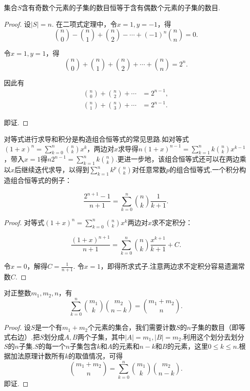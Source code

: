 \begin{corollary}
    集合\(S\)含有奇数个元素的子集的数目恒等于含有偶数个元素的子集的数目.
\end{corollary}
\begin{proof}
    设\(|S|=n\). 在二项式定理中，令\(x=1,y=-1\)，得
    \[\binom{n}{0} - \binom{n}{1} + \binom{n}{2} - \cdots + (-1)^n \binom{n}{n} = 0 .\]

    令\(x=1,y=1\)，得
    \[\binom{n}{0} + \binom{n}{1} + \binom{n}{2} + \cdots + \binom{n}{n} = 2^n.\]

    因此有
    \begin{align*}
\binom{n}{0} + \binom{n}{2} + \cdots &= 2^{n-1}, \\
\binom{n}{1} + \binom{n}{3} + \cdots &= 2^{n-1}.
    \end{align*}

    即证.
\end{proof}

对等式进行求导和积分是构造组合恒等式的常见思路.如对等式\((1 + x)^n = \sum_{k=0}^{n} \binom{n}{k} x^k\)，两边对\(x\)求导得\(n(1 + x)^{n-1} = \sum_{k=1}^{n} k \binom{n}{k} x^{k-1}\)，带入\(x=1\)得\(n 2^{n-1} = \sum_{k=1}^{n} k \binom{n}{k}\).更进一步地，该组合恒等式还可以在两边乘以\(x\)后继续迭代求导，以得到\(\sum_{k=1}^{n} k^p \binom{n}{k}\)对任意常数\(p\)的组合恒等式.一个积分构造组合恒等式的例子：

\begin{corollary}
    $$\frac{2^{n+1}-1}{n+1} = \sum_{k=0}^{n} \binom{n}{k} \frac{1}{k+1}.$$
\end{corollary}
\begin{proof}
    对等式\((1 + x)^n = \sum_{k=0}^{n} \binom{n}{k} x^k\)两边对\(x\)求不定积分：

    \[\frac{(1+x)^{n+1}}{n+1} = \sum_{k=0}^{n} \binom{n}{k} \frac{x^{k+1}}{k+1} + C.\]

    令\(x=0\)，解得\(C=\frac{1}{n+1}\). 令\(x=1\)，即得所求式子.注意两边求不定积分容易遗漏常数\(C\).
\end{proof}

\begin{corollary}[范德蒙卷积公式]
    对正整数\(m_1, m_2, n\)，有
    \[\sum_{k=0}^{n} \binom{m_1}{k} \binom{m_2}{n-k} = \binom{m_1+m_2}{n}.\]
\end{corollary}
\begin{proof}
    设\(S\)是一个有\(m_1+m_2\)个元素的集合，我们需要计数\(S\)的\(n\)子集的数目（即等式右边）.把\(S\)划分成\(A,B\)两个子集，其中\(|A|=m_1,|B|=m_2\).利用这个划分去划分\(S\)的\(n\)子集.\(S\)的每一个\(n\)子集包含\(k\)和\(A\)的元素和\(n-k\)和\(B\)的元素，这里\(0\leq k \leq n\).根据加法原理计数所有\(k\)的取值情况，可得
    \[\binom{m_1+m_2}{n}=\sum_{k=0}^{n} \binom{m_1}{k} \binom{m_2}{n-k} .\]
    即证.
\end{proof}

